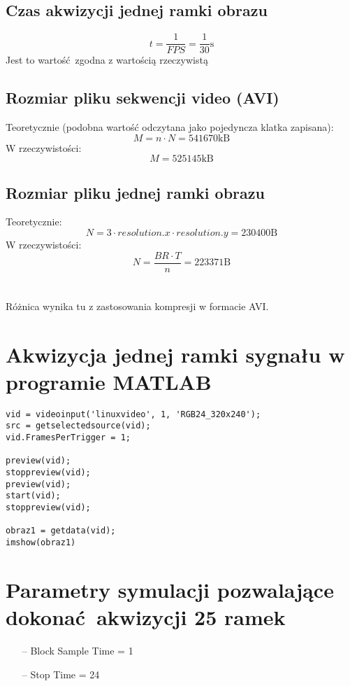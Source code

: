 \documentclass[a4paper, 12pt, titlepage]{article}
\begin{document}
        \subsection{Czas akwizycji jednej ramki obrazu}
            $$
                t = \frac{1}{FPS} = \frac{1}{30} \mathrm{s}
            $$
            Jest to wartość zgodna z wartością rzeczywistą
        \subsection{Rozmiar pliku sekwencji video (AVI)}
            Teoretycznie (podobna wartość odczytana jako pojedyncza klatka 
            zapisana):
            $$
                M = n \cdot N = 541 670 \mathrm{kB}
            $$
            W rzeczywistości:
            $$
                M = 525 145 \mathrm{kB}
            $$
        \subsection{Rozmiar pliku jednej ramki obrazu}
            Teoretycznie:
            $$
                N = 3 \cdot resolution.x \cdot resolution.y = 230400 \mathrm{B}
            $$
            W rzeczywistości:
            $$
                N = \frac{BR \cdot T}{n} =  223 371 \mathrm{B}
            $$
        \\ \\
        Różnica wynika tu z zastosowania kompresji w formacie AVI.
    \section{Akwizycja jednej ramki sygnału w programie MATLAB}
\begin{lstlisting}
vid = videoinput('linuxvideo', 1, 'RGB24_320x240');
src = getselectedsource(vid);
vid.FramesPerTrigger = 1;

preview(vid);
stoppreview(vid);
preview(vid);
start(vid);
stoppreview(vid);

obraz1 = getdata(vid);
imshow(obraz1)
\end{lstlisting}
    \section{Parametry symulacji pozwalające dokonać akwizycji 25 ramek}
        \begin{itemize}
            \item[--] Block Sample Time = 1
            \item[--] Stop Time = 24
        \end{itemize}
\end{document}
